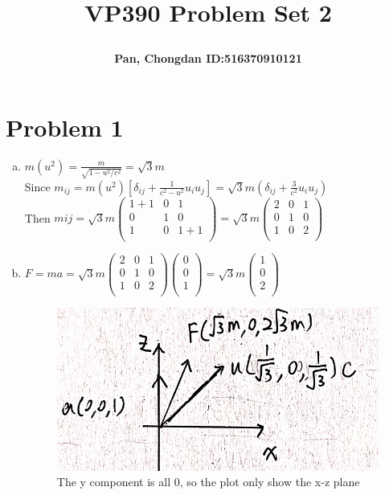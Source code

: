 \documentclass[a4paper]{article}
\title{\Large \textbf{VP390 Problem Set 2}\\
\author{\textbf{Pan, Chongdan ID:516370910121}\\
}
}
\begin{document}
\maketitle
\section{Problem 1}
\begin{enumerate}[(a)]
    \item $m(u^2)=\frac{m}{\sqrt{1-u^2/c^2}}=\sqrt{3}m$
    \\Since $m_{ij}=m(u^2)[\delta_{ij}+\frac{1}{c^2-u^2}u_iu_j]=\sqrt{3}m(\delta_{ij}+\frac{3}{c^2}u_iu_j)$
    \\Then $mij=\sqrt{3}m\left(                
    \begin{array}{ccc}   
      1+1 & 0 & 1\\ 
      0 & 1 & 0\\  
      1 & 0 & 1+1\\  
    \end{array}
    \right)=\sqrt{3}m\left(
    \begin{array}{ccc}   
        2 & 0 & 1\\ 
        0 & 1 & 0\\  
        1 & 0 & 2\\  
      \end{array}
  \right) $
  \item $F=ma=\sqrt{3}m\left(\begin{array}{ccc}   
    2 & 0 & 1\\ 
    0 & 1 & 0\\  
    1 & 0 & 2\\  
  \end{array}\right)\left(\begin{array}{ccc}   
    0\\ 
    0\\  
    1\\  
  \end{array}\right)=\sqrt{3}m\left(\begin{array}{ccc}   
    1\\ 
    0\\  
    2\\  
  \end{array}\right)$
  \begin{figure}[H]
    \centering
    \includegraphics[scale=0.25]{P1.png}
    \caption{The y component is all 0, so the plot only show the x-z plane}
    \label{P1}
\end{figure}

\end{enumerate}
\end{document}
